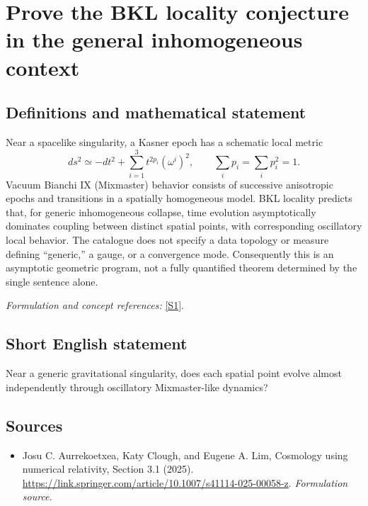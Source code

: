\documentclass[11pt]{article}
\begin{document}
\section*{\texorpdfstring{Prove the BKL locality conjecture in the general inhomogeneous context}{Prove the BKL locality conjecture in the general inhomogeneous context}}\label{117}
\subsection{Definitions and mathematical statement}
Near a spacelike singularity, a Kasner epoch has a schematic local metric
\[
 ds^2\simeq-dt^2+\sum_{i=1}^3t^{2p_i}(\omega^i)^2,\qquad
 \sum_i p_i=\sum_i p_i^2=1.
\]
Vacuum Bianchi IX (Mixmaster) behavior consists of successive anisotropic epochs and transitions in a spatially homogeneous model. BKL locality predicts that, for generic inhomogeneous collapse, time evolution asymptotically dominates coupling between distinct spatial points, with corresponding oscillatory local behavior. The catalogue does not specify a data topology or measure defining ``generic,'' a gauge, or a convergence mode. Consequently this is an asymptotic geometric program, not a fully quantified theorem determined by the single sentence alone.
\par\smallskip\textit{Formulation and concept references:} \href{https://link.springer.com/article/10.1007/s41114-025-00058-z}{[S1]}.

\subsection{Short English statement}
Near a generic gravitational singularity, does each spatial point evolve almost independently through oscillatory Mixmaster-like dynamics?
\subsection{Sources}
\begin{itemize}
\item[S1]Josu C. Aurrekoetxea, Katy Clough, and Eugene A. Lim, Cosmology using numerical relativity, Section 3.1 (2025).
\url{https://link.springer.com/article/10.1007/s41114-025-00058-z}.
\textit{Formulation source.}
\end{itemize}
\end{document}
